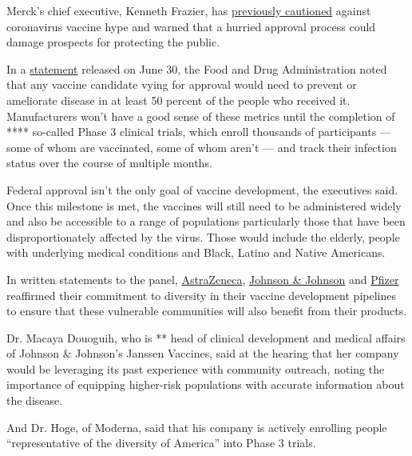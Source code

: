Merck's chief executive, Kenneth Frazier, has
\href{https://www.fiercepharma.com/vaccines/merck-ceo-frazier-says-covid-19-vaccine-hype-a-grave-disservice-to-public}{previously
cautioned} against coronavirus vaccine hype and warned that a hurried
approval process could damage prospects for protecting the public.

In a
\href{https://www.fda.gov/news-events/press-announcements/coronavirus-covid-19-update-fda-takes-action-help-facilitate-timely-development-safe-effective-covid}{statement}
released on June 30, the Food and Drug Administration noted that any
vaccine candidate vying for approval would need to prevent or ameliorate
disease in at least 50 percent of the people who received it.
Manufacturers won't have a good sense of these metrics until the
completion of **** so-called Phase 3 clinical trials, which enroll
thousands of participants --- some of whom are vaccinated, some of whom
aren't --- and track their infection status over the course of multiple
months.

Federal approval isn't the only goal of vaccine development, the
executives said. Once this milestone is met, the vaccines will still
need to be administered widely and also be accessible to a range of
populations particularly those that have been disproportionately
affected by the virus. Those would include the elderly, people with
underlying medical conditions and Black, Latino and Native Americans.

In written statements to the panel,
\href{https://energycommerce.house.gov/sites/democrats.energycommerce.house.gov/files/documents/Testimony\%20-\%20Pangalos\%2020200721_0.pdf}{AstraZeneca},
\href{https://energycommerce.house.gov/sites/democrats.energycommerce.house.gov/files/documents/Testimony\%20-\%20Douoguih\%2020200721_0.pdf}{Johnson
\& Johnson} and
\href{https://energycommerce.house.gov/sites/democrats.energycommerce.house.gov/files/documents/Testimony\%20-\%20Young\%2020200721_0.pdf}{Pfizer}
reaffirmed their commitment to diversity in their vaccine development
pipelines to ensure that these vulnerable communities will also benefit
from their products.

Dr. Macaya Douoguih, who is ** head of clinical development and medical
affairs of Johnson \& Johnson's Janssen Vaccines, said at the hearing
that her company would be leveraging its past experience with community
outreach, noting the importance of equipping higher-risk populations
with accurate information about the disease.

And Dr. Hoge, of Moderna, said that his company is actively enrolling
people ``representative of the diversity of America'' into Phase 3
trials.

